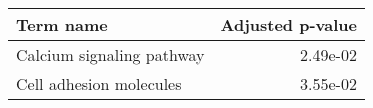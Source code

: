 \begin{tabular}{lr}
\toprule
                Term name &  Adjusted p-value \\
\midrule
Calcium signaling pathway &          2.49e-02 \\
  Cell adhesion molecules &          3.55e-02 \\
\bottomrule
\end{tabular}
